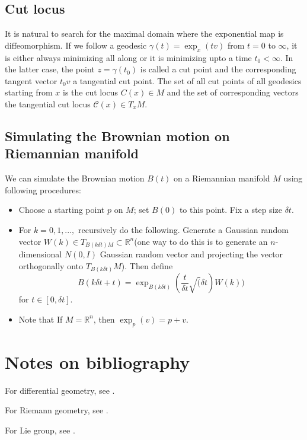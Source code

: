 \begin{refsection}
\subsection{Cut locus }
\cite{Pennec2006}It is natural to search for the maximal domain where the exponential map is diffeomorphism. If we follow a geodesic $\gamma(t) = \exp_x(t v)$ from $t = 0$ to $\infty$, it is either always minimizing all along or it is minimizing upto a time $t_0 < \infty$. In the latter case, the point $z = \gamma(t_0)$ is called a cut point and the corresponding tangent vector $t_0v$ a tangential cut point. The set of all cut points of all geodesics starting from $x$ is the cut locus $C(x) \in M$ and the set of corresponding vectors the tangential cut locus $\mathcal{C}(x)\in T_xM$. 

\subsection{Simulating the Brownian motion on Riemannian manifold }

We can simulate the Brownian motion $B(t)$ on a Riemannian manifold $M$ using following procedures:\cite{Manton2013}
\begin{itemize}
	\item Choose a starting point $p$ on $M$; set $B(0)$ to this point. Fix a step size $\delta t$.
	\item For $k=0,1,...,$ recursively do the following. Generate a Gaussian random vector $W(k) \in T_{B(k\delta t)M} \subset \mathbb{R}^n$(one way to do this is to generate an $n$-dimensional $N(0,I)$ Gaussian random vector and projecting the vector orthogonally onto $T_{B(k\delta t)}M$). Then define
	$$B(k\delta t + t) = \exp_{B(k\delta t)}(\frac{t}{\delta t}\sqrt(\delta t)W(k))$$ for $t\in [0,\delta t]$.
	\item Note that If $M = \mathbb{R}^n$, then $\exp_p(v) = p + v$.
\end{itemize}



\section{Notes on bibliography}



For differential geometry, see \cite{kreyszig2013differential}.

For Riemann geometry, see \cite{mcinerney2013first}.

For Lie group, see \cite{chirikjian2011stochastic}\cite{chirikjian2011stochastic1}\cite{frankel2004geometry}.

\printbibliography
\end{refsection}
